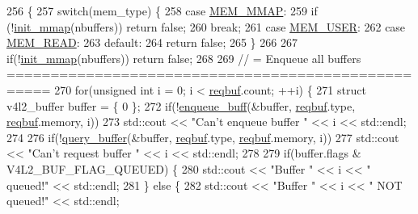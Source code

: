 \begin{DoxyCode}
256                                                                     \{
257     \textcolor{keywordflow}{switch}(mem\_type) \{
258         \textcolor{keywordflow}{case} \hyperlink{classv4lcap_aae799230441b7965d8947b104d8d753ea910bccf6fae3859b962b253fca85ad2a}{MEM\_MMAP}:
259             \textcolor{keywordflow}{if} (!\hyperlink{classv4lcap_a04f75c0a68f0e8547925906a488bb50d}{init\_mmap}(nbuffers)) \textcolor{keywordflow}{return} \textcolor{keyword}{false};
260             \textcolor{keywordflow}{break};
261         \textcolor{keywordflow}{case} \hyperlink{classv4lcap_aae799230441b7965d8947b104d8d753ea30efcf7ca101412a17c617333e1bb064}{MEM\_USER}:
262         \textcolor{keywordflow}{case} \hyperlink{classv4lcap_aae799230441b7965d8947b104d8d753eaa973888f299d63462efa19c3e52d416c}{MEM\_READ}:
263         \textcolor{keywordflow}{default}:
264             \textcolor{keywordflow}{return} \textcolor{keyword}{false};
265     \}
266 
267     \textcolor{keywordflow}{if}(!\hyperlink{classv4lcap_a04f75c0a68f0e8547925906a488bb50d}{init\_mmap}(nbuffers)) \textcolor{keywordflow}{return} \textcolor{keyword}{false};
268 
269     \textcolor{comment}{// = Enqueue all buffers ===================================================}
270     \textcolor{keywordflow}{for}(\textcolor{keywordtype}{unsigned} \textcolor{keywordtype}{int} i = 0; i < \hyperlink{classv4lcap_a4b98d5a7e7859a8e234d54649ea9251e}{reqbuf}.count; ++i) \{
271         \textcolor{keyword}{struct }v4l2\_buffer buffer = \{ 0 \};
272         \textcolor{keywordflow}{if}(!\hyperlink{classv4lcap_a61dcacb5bb57a9f8c72d6942f46e9ddc}{enqueue\_buff}(&buffer, \hyperlink{classv4lcap_a4b98d5a7e7859a8e234d54649ea9251e}{reqbuf}.type, \hyperlink{classv4lcap_a4b98d5a7e7859a8e234d54649ea9251e}{reqbuf}.memory, i))
273             std::cout << \textcolor{stringliteral}{"Can't enqueue buffer "} << i << std::endl;
274 
276         \textcolor{keywordflow}{if}(!\hyperlink{classv4lcap_a238573a18b367ebc812a49f4f1917012}{query\_buffer}(&buffer, \hyperlink{classv4lcap_a4b98d5a7e7859a8e234d54649ea9251e}{reqbuf}.type, \hyperlink{classv4lcap_a4b98d5a7e7859a8e234d54649ea9251e}{reqbuf}.memory, i))
277             std::cout << \textcolor{stringliteral}{"Can't request buffer "} << i << std::endl;
278 
279         \textcolor{keywordflow}{if}(buffer.flags & V4L2\_BUF\_FLAG\_QUEUED) \{
280             std::cout << \textcolor{stringliteral}{"Buffer "} << i << \textcolor{stringliteral}{" queued!"} << std::endl;
281         \} \textcolor{keywordflow}{else} \{
282             std::cout << \textcolor{stringliteral}{"Buffer "} << i << \textcolor{stringliteral}{" NOT queued!"} << std::endl;

\end{DoxyCode}
